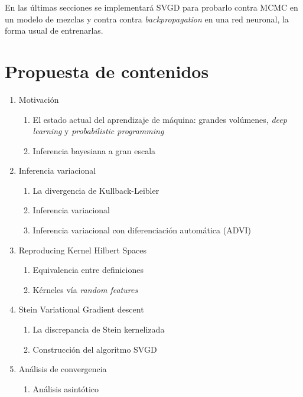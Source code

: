 \documentclass[11pt]{article}
\begin{document}
En las últimas secciones se implementará SVGD para probarlo contra MCMC en un modelo de mezclas y contra contra \textit{backpropagation} en una red neuronal, la forma usual de entrenarlas.	
\section{Propuesta de contenidos}
\begin{enumerate}
	\item Motivación
	\begin{enumerate}[label=1.\arabic*]
		\item El estado actual del aprendizaje de máquina:  grandes volúmenes, \textit{deep learning} y \textit{probabilistic programming} 
		\item Inferencia bayesiana a gran escala
	\end{enumerate}
	\item Inferencia variacional
	\begin{enumerate}[label=2.\arabic*]
		\item La divergencia de Kullback-Leibler
		\item Inferencia variacional \cite{vi}
		\item Inferencia variacional con diferenciación automática (ADVI) \cite{Kucukelbir2016}
	\end{enumerate}
	\item Reproducing Kernel Hilbert Spaces \cite{Berlinet2009}
	\begin{enumerate}[label=3.\arabic*]
		\item Equivalencia entre definiciones %
		\item Kérneles vía \textit{random features} \cite{Rahimi}
	\end{enumerate}
	\item Stein Variational Gradient descent
	\begin{enumerate}[label=4.\arabic*]
		\item La discrepancia de Stein kernelizada \cite{kernelized-stein-discrepancy, measuring-quality}
		\item Construcción del algoritmo SVGD \cite{svgd}
	\end{enumerate}
	\item Análisis de convergencia 
	\begin{enumerate}[label=5.\arabic*]
		\item Análisis asintótico \cite{svgd-gradient-flow}
		\begin{enumerate}[label=5.1.\arabic*]

\end{enumerate}
\end{enumerate}
\end{enumerate}
\end{document}
